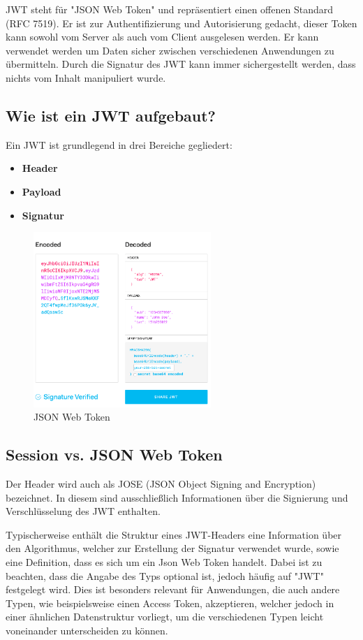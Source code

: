JWT steht für "JSON Web Token" und repräsentiert einen offenen Standard (RFC 7519). Er ist zur Authentifizierung und Autorisierung gedacht, dieser Token kann sowohl vom Server als auch vom Client ausgelesen werden. Er kann verwendet werden um Daten sicher zwischen verschiedenen Anwendungen zu übermitteln. Durch die Signatur des JWT kann immer sichergestellt werden, dass nichts vom Inhalt manipuliert wurde.


\subsection{Wie ist ein JWT aufgebaut?}
Ein JWT ist grundlegend in drei Bereiche gegliedert:

\begin{itemize}
\item \textbf{Header}
\item \textbf{Payload}
\item \textbf{Signatur}
\end{itemize}

\begin{figure}[h!]
    \centering
    \includegraphics[width=0.6\textwidth]{pics/jwt.png}
    \caption{JSON Web Token}
    \label{fig:enter-label}
\end{figure}

\subsection{Session vs. JSON Web Token}


Der Header wird auch als JOSE (JSON Object Signing and Encryption) bezeichnet. In diesem sind ausschließlich Informationen über die Signierung und Verschlüsselung des JWT enthalten.

Typischerweise enthält die Struktur eines JWT-Headers eine Information über den Algorithmus, welcher zur Erstellung der Signatur verwendet wurde, sowie eine Definition, dass es sich um ein Json Web Token handelt. Dabei ist zu beachten, dass die Angabe des Typs optional ist, jedoch häufig auf "JWT" festgelegt wird. Dies ist besonders relevant für Anwendungen, die auch andere Typen, wie beispielsweise einen Access Token, akzeptieren, welcher jedoch in einer ähnlichen Datenstruktur vorliegt, um die verschiedenen Typen leicht voneinander unterscheiden zu können.

